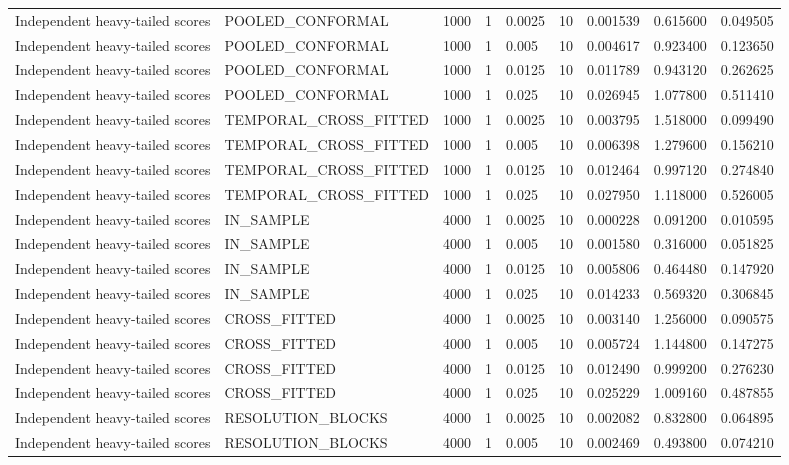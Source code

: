 \begin{tabular}{lllllllll}
Independent heavy-tailed scores & POOLED\_CONFORMAL & 1000 & 1 & 0.0025 & 10 & 0.001539 & 0.615600 & 0.049505 \\
Independent heavy-tailed scores & POOLED\_CONFORMAL & 1000 & 1 & 0.005 & 10 & 0.004617 & 0.923400 & 0.123650 \\
Independent heavy-tailed scores & POOLED\_CONFORMAL & 1000 & 1 & 0.0125 & 10 & 0.011789 & 0.943120 & 0.262625 \\
Independent heavy-tailed scores & POOLED\_CONFORMAL & 1000 & 1 & 0.025 & 10 & 0.026945 & 1.077800 & 0.511410 \\
Independent heavy-tailed scores & TEMPORAL\_CROSS\_FITTED & 1000 & 1 & 0.0025 & 10 & 0.003795 & 1.518000 & 0.099490 \\
Independent heavy-tailed scores & TEMPORAL\_CROSS\_FITTED & 1000 & 1 & 0.005 & 10 & 0.006398 & 1.279600 & 0.156210 \\
Independent heavy-tailed scores & TEMPORAL\_CROSS\_FITTED & 1000 & 1 & 0.0125 & 10 & 0.012464 & 0.997120 & 0.274840 \\
Independent heavy-tailed scores & TEMPORAL\_CROSS\_FITTED & 1000 & 1 & 0.025 & 10 & 0.027950 & 1.118000 & 0.526005 \\
Independent heavy-tailed scores & IN\_SAMPLE & 4000 & 1 & 0.0025 & 10 & 0.000228 & 0.091200 & 0.010595 \\
Independent heavy-tailed scores & IN\_SAMPLE & 4000 & 1 & 0.005 & 10 & 0.001580 & 0.316000 & 0.051825 \\
Independent heavy-tailed scores & IN\_SAMPLE & 4000 & 1 & 0.0125 & 10 & 0.005806 & 0.464480 & 0.147920 \\
Independent heavy-tailed scores & IN\_SAMPLE & 4000 & 1 & 0.025 & 10 & 0.014233 & 0.569320 & 0.306845 \\
Independent heavy-tailed scores & CROSS\_FITTED & 4000 & 1 & 0.0025 & 10 & 0.003140 & 1.256000 & 0.090575 \\
Independent heavy-tailed scores & CROSS\_FITTED & 4000 & 1 & 0.005 & 10 & 0.005724 & 1.144800 & 0.147275 \\
Independent heavy-tailed scores & CROSS\_FITTED & 4000 & 1 & 0.0125 & 10 & 0.012490 & 0.999200 & 0.276230 \\
Independent heavy-tailed scores & CROSS\_FITTED & 4000 & 1 & 0.025 & 10 & 0.025229 & 1.009160 & 0.487855 \\
Independent heavy-tailed scores & RESOLUTION\_BLOCKS & 4000 & 1 & 0.0025 & 10 & 0.002082 & 0.832800 & 0.064895 \\
Independent heavy-tailed scores & RESOLUTION\_BLOCKS & 4000 & 1 & 0.005 & 10 & 0.002469 & 0.493800 & 0.074210 \\

\end{tabular}

